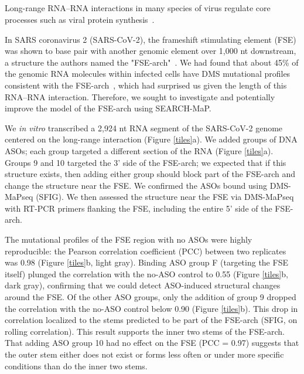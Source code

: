 \documentclass[main.tex]{subfiles}
\begin{document}
\subsection{}

Long-range RNA--RNA interactions in many species of virus regulate core processes such as viral protein synthesis~\cite{Nicholson2014}.

In SARS coronavirus 2 (SARS-CoV-2), the frameshift stimulating element (FSE) was shown to base pair with another genomic element over 1,000 nt downstream, a structure the authors named the "FSE-arch"~\cite{Ziv2020}.
We had found that about 45\% of the genomic RNA molecules within infected cells have DMS mutational profiles consistent with the FSE-arch~\cite{Lan2022}, which had surprised us given the length of this RNA--RNA interaction.
Therefore, we sought to investigate and potentially improve the model of the FSE-arch using SEARCH-MaP.




We \textit{in vitro} transcribed a 2,924 nt RNA segment of the SARS-CoV-2 genome centered on the long-range interaction (Figure \ref{tiles}a).
We added groups of DNA ASOs; each group targeted a different section of the RNA (Figure \ref{tiles}a).
Groups 9 and 10 targeted the 3' side of the FSE-arch; we expected that if this structure exists, then adding either group should block part of the FSE-arch and change the structure near the FSE.
We confirmed the ASOs bound using DMS-MaPseq (SFIG).
We then assessed the structure near the FSE via DMS-MaPseq with RT-PCR primers flanking the FSE, including the entire 5' side of the FSE-arch.

The mutational profiles of the FSE region with no ASOs were highly reproducible: the Pearson correlation coefficient (PCC) between two replicates was 0.98 (Figure \ref{tiles}b, light gray).
Binding ASO group F (targeting the FSE itself) plunged the correlation with the no-ASO control to 0.55 (Figure \ref{tiles}b, dark gray), confirming that we could detect ASO-induced structural changes around the FSE.
Of the other ASO groups, only the addition of group 9 dropped the correlation with the no-ASO control below 0.90 (Figure \ref{tiles}b).
This drop in correlation localized to the stems predicted to be part of the FSE-arch (SFIG, on rolling correlation).
This result supports the inner two stems of the FSE-arch.
That adding ASO group 10 had no effect on the FSE (PCC = 0.97) suggests that the outer stem either does not exist or forms less often or under more specific conditions than do the inner two stems.
\end{document}
